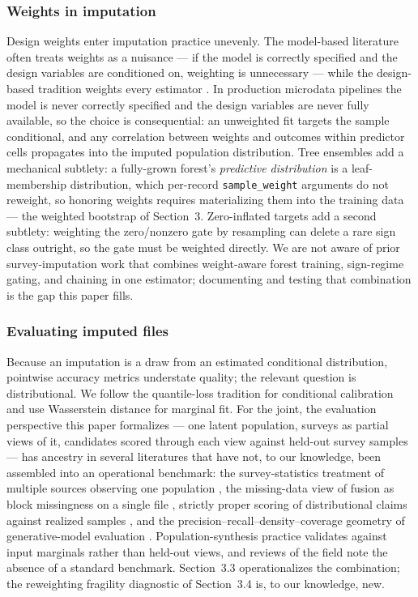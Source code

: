 \subsubsection{Weights in imputation}

Design weights enter imputation practice unevenly. The model-based literature
often treats weights as a nuisance --- if the model is correctly specified and
the design variables are conditioned on, weighting is unnecessary --- while
the design-based tradition weights every estimator \citep{little2002statistical}.
In production microdata pipelines the model is never correctly specified and
the design variables are never fully available, so the choice is consequential:
an unweighted fit targets the sample conditional, and any correlation between
weights and outcomes within predictor cells propagates into the imputed
population distribution. Tree ensembles add a mechanical subtlety: a
fully-grown forest's \emph{predictive distribution} is a leaf-membership
distribution, which per-record \texttt{sample\_weight} arguments do not
reweight, so honoring weights requires materializing them into the training
data --- the weighted bootstrap of Section~3. Zero-inflated targets add a
second subtlety: weighting the zero/nonzero gate by resampling can delete a
rare sign class outright, so the gate must be weighted directly. We are not
aware of prior survey-imputation work that combines weight-aware forest
training, sign-regime gating, and chaining in one estimator; documenting and
testing that combination is the gap this paper fills.

\subsubsection{Evaluating imputed files}

Because an imputation is a draw from an estimated conditional distribution,
pointwise accuracy metrics understate quality; the relevant question is
distributional. We follow the quantile-loss tradition for conditional
calibration \citep{koenker2005quantile, meinshausen2006quantile} and use
Wasserstein distance for marginal fit. For the joint, the evaluation
perspective this paper formalizes --- one latent population, surveys as
partial views of it, candidates scored through each view against held-out
survey samples --- has ancestry in several literatures that have not, to our
knowledge, been assembled into an operational benchmark: the survey-statistics
treatment of multiple sources observing one population
\citep{lohr2017combining}, the missing-data view of fusion as block
missingness on a single file \citep{little2002statistical,
rassler2002statistical}, strictly proper scoring of distributional claims
against realized samples \citep{gneiting2007strictly, szekely2013energy}, and
the precision--recall--density--coverage geometry of generative-model
evaluation \citep{naeem2020reliable}. Population-synthesis practice validates
against input marginals rather than held-out views, and reviews of the field
note the absence of a standard benchmark. Section~3.3 operationalizes the
combination; the reweighting fragility diagnostic of Section~3.4 is, to our
knowledge, new.
